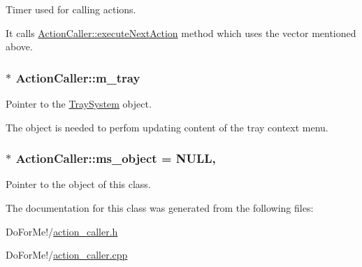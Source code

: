 Timer used for calling actions. 

It calls \hyperlink{class_action_caller_a4ffffa40b0fb64880184b746a150bbb1}{Action\-Caller\-::execute\-Next\-Action} method which uses the vector mentioned above. \hypertarget{class_action_caller_a718babb42edf522f7d24d99a6fb3c1a0}{
\subsubsection[{m\-\_\-tray}]{$\ast$ Action\-Caller\-::m\-\_\-tray\hspace{0.3cm}{\ttfamily [private]}}}\label{class_action_caller_a718babb42edf522f7d24d99a6fb3c1a0}


Pointer to the \hyperlink{class_tray_system}{Tray\-System} object. 

The object is needed to perfom updating content of the tray context menu. \hypertarget{class_action_caller_ab39d205dd66f6556f924e7ea0cbe797c}{
\subsubsection[{ms\-\_\-object}]{ $\ast$ Action\-Caller\-::ms\-\_\-object = N\-U\-L\-L\hspace{0.3cm}{\ttfamily [static]}, {\ttfamily [private]}}}\label{class_action_caller_ab39d205dd66f6556f924e7ea0cbe797c}


Pointer to the object of this class. 



The documentation for this class was generated from the following files\-:\begin{DoxyCompactItemize}
\item 
Do\-For\-Me!/\hyperlink{action__caller_8h}{action\-\_\-caller.\-h}\item 
Do\-For\-Me!/\hyperlink{action__caller_8cpp}{action\-\_\-caller.\-cpp}\end{DoxyCompactItemize}
